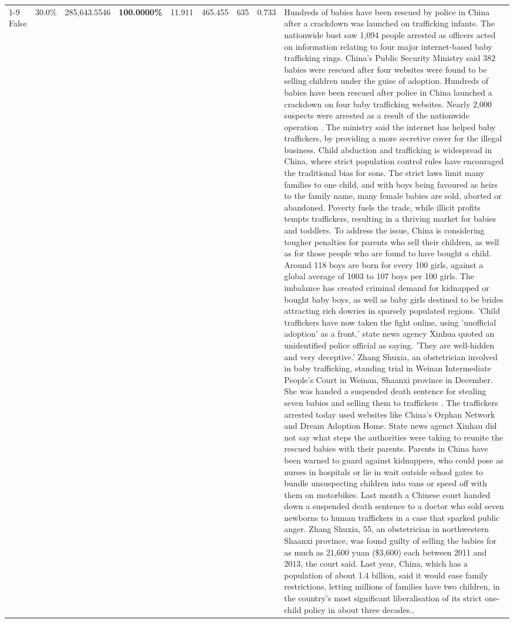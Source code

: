 \begin{table}[H]
\begin{tabular}{lllrlllll}
\cline{1-9}
False & 30.0\% & \color{red} 285,643.5546 & \bfseries \color{red} 100.0000\% & 11.911 & 465.455 & 635 & 0.733 & Hundreds of babies have been rescued by police in China after a crackdown was launched on trafficking infants. The nationwide bust saw 1,094 people arrested as officers acted on information relating to four major internet-based baby trafficking rings. China's Public Security Ministry said 382 babies were rescued after four websites were found to be selling children under the guise of adoption. Hundreds of babies have been rescued after police in China launched a crackdown on four baby trafficking websites. Nearly 2,000 suspects were arrested as a result of the nationwide operation . The ministry said the internet has helped baby traffickers, by providing a more secretive cover for the illegal business. Child abduction and trafficking is widespread in China, where strict population control rules have encouraged the traditional bias for sons. The strict laws limit many families to one child, and with boys being favoured as heirs to the family name, many female babies are sold, aborted or abandoned. Poverty fuels the trade, while illicit profits tempts traffickers, resulting in a thriving market for babies and toddlers. To address the issue, China is considering tougher penalties for parents who sell their children, as well as for those people who are found to have bought a child. Around 118 boys are born for every 100 girls, against a global average of 1003 to 107 boys per 100 girls. The imbalance has created criminal demand for kidnapped or bought baby boys, as well as baby girls destined to be brides attracting rich dowries in sparsely populated regions. 'Child traffickers have now taken the fight online, using 'unofficial adoption' as a front,' state news agency Xinhua quoted an unidentified police official as saying. 'They are well-hidden and very deceptive.' Zhang Shuxia, an obstetrician involved in baby trafficking, standing trial in Weinan Intermediate People's Court in Weinan, Shaanxi province in December. She was handed a suspended death sentence for stealing seven babies and selling them to traffickers . The traffickers arrested today used websites like China's Orphan Network and Dream Adoption Home. State news agenct Xinhau did not say what steps the authorities were taking to reunite the rescued babies with their parents. Parents in China have been warned to guard against kidnappers, who could pose as nurses in hospitals or lie in wait outside school gates to bundle unsuspecting children into vans or speed off with them on motorbikes. Last month a Chinese court handed down a suspended death sentence to a doctor who sold seven newborns to human traffickers in a case that sparked public anger. Zhang Shuxia, 55, an obstetrician in northwestern Shaanxi province, was found guilty of selling the babies for as much as 21,600 yuan (\$3,600) each between 2011 and 2013, the court said. Last year, China, which has a population of about 1.4 billion, said it would ease family restrictions, letting millions of families have two children, in the country's most significant liberalisation of its strict one-child policy in about three decades.. \\

\end{tabular}
\end{table}
